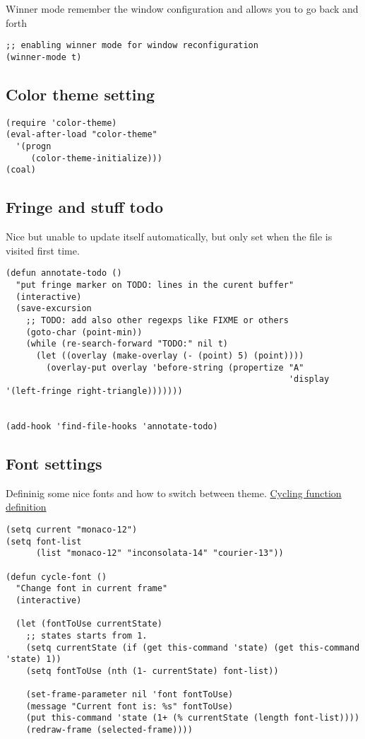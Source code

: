 \documentclass[11pt]{article}
\begin{document}
   Winner mode remember the window configuration and allows you to go back and forth
\begin{verbatim}
;; enabling winner mode for window reconfiguration
(winner-mode t)
\end{verbatim}
\subsection{Color theme setting}
\label{sec-22.5}

\begin{verbatim}
(require 'color-theme)
(eval-after-load "color-theme"
  '(progn
     (color-theme-initialize)))
(coal)
\end{verbatim}
\subsection{Fringe and stuff todo}
\label{sec-22.6}

   Nice but unable to update itself automatically, but only set when the file is visited first time.
\begin{verbatim}
(defun annotate-todo ()
  "put fringe marker on TODO: lines in the curent buffer"
  (interactive)
  (save-excursion
    ;; TODO: add also other regexps like FIXME or others
    (goto-char (point-min))
    (while (re-search-forward "TODO:" nil t)
      (let ((overlay (make-overlay (- (point) 5) (point))))
        (overlay-put overlay 'before-string (propertize "A"
                                                        'display '(left-fringe right-triangle)))))))


(add-hook 'find-file-hooks 'annotate-todo)
\end{verbatim}

  
\subsection{Font settings}
\label{sec-22.7}

  Defininig some nice fonts and how to switch between theme.
  \href{http://xahlee.org/emacs/emacs_unicode_fonts.html}{Cycling function definition}
\begin{verbatim}
(setq current "monaco-12")
(setq font-list
      (list "monaco-12" "inconsolata-14" "courier-13"))

(defun cycle-font ()
  "Change font in current frame"
  (interactive)

  (let (fontToUse currentState)
    ;; states starts from 1.
    (setq currentState (if (get this-command 'state) (get this-command 'state) 1))
    (setq fontToUse (nth (1- currentState) font-list))

    (set-frame-parameter nil 'font fontToUse)
    (message "Current font is: %s" fontToUse)
    (put this-command 'state (1+ (% currentState (length font-list))))
    (redraw-frame (selected-frame))))
\end{verbatim}
\end{document}
